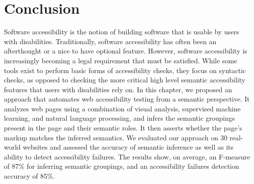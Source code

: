 \section{Conclusion}

Software accessibility is the notion of building software that 
is usable by users with disabilities. Traditionally, software 
accessibility has often been an afterthought or a nice to have 
optional feature. However, software accessibility is increasingly 
becoming a legal requirement that must be satisfied. 
While some tools exist to perform basic forms of accessibility checks, 
they focus on syntactic checks, as opposed to checking the more critical 
high level semantic accessibility features that users with disabilities 
rely on. 
In this chapter, we proposed an approach that automates web accessibility 
testing from a semantic perspective. It analyzes web pages using a combination 
of visual analysis, supervised machine learning, and natural language 
processing, and infers the semantic groupings present in the page 
and their semantic roles. 
It then asserts whether the page's markup matches the inferred semantics. 
We evaluated our approach on 30 real-world websites and assessed the accuracy 
of semantic inference as well as its ability to detect accessibility failures. 
The results show, on average, an F-measure of 87\% for 
inferring semantic groupings, and an accessibility failures detection accuracy 
of 85\%.

